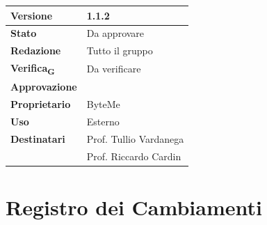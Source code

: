\documentclass[11pt,a4paper]{article}
\newcommand{\gls}[1]{#1\textsubscript{G}}
\begin{document}
\begin{titlepage}
    \begin{table}[H]
        \centering
        \begin{tabular}{|l|p{5cm}|}
            \hline
            \textbf{Versione} & 1.1.2 \\
            \hline
            \textbf{Stato} & Da approvare\\
            \hline
            \textbf{Redazione} & Tutto il gruppo \\
            \hline
            \textbf{\gls{Verifica}} & Da verificare \\
            \hline
            \textbf{Approvazione} & \\
            \hline
            \textbf{Proprietario} & ByteMe \\
            \hline
            \textbf{Uso} & Esterno \\
            \hline
            \textbf{Destinatari} & Prof. Tullio Vardanega \\ & Prof. Riccardo Cardin \\
            \hline
        \end{tabular}
    \end{table}
    
    \vfill
\end{titlepage}

\thispagestyle{empty}
\section*{Registro dei Cambiamenti}
\end{document}
